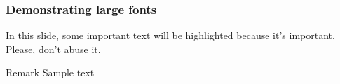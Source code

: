 \documentclass{beamer}
\begin{document}
\frame{\titlepage}

\begin{frame}
  \frametitle{Demonstrating large fonts}

  In this slide, some important text will be
  \alert{highlighted} because it's important.
  Please, don't abuse it.
\end{frame}

\begin{frame}
  \begin{block}{Remark}
    Sample text
  \end{block}
\end{frame}
\end{document}
